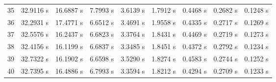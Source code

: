 \begin{landscape}
\begin{longtable}{cllllllll}
    35 &32.9116 s& 16.6887 s& 7.7993 s& 3.6139 s& 1.7912 s& 0.4468 s& 0.2682 s& 0.1248 s\\
    36 &32.2931 s& 17.4771 s& 6.6512 s& 3.4691 s& 1.9558 s& 0.4335 s& 0.2717 s& 0.1269 s\\
    37 &32.5576 s& 16.2437 s& 6.6823 s& 3.3764 s & 1.8431 s& 0.4469 s& 0.2719 s& 0.1273 s\\
    38 &32.4156 s& 16.1199 s & 6.6837 s& 3.3485 s& 1.8451 s& 0.4372 s& 0.2792 s& 0.1234 s\\
    39 &32.7322 s& 16.1902 s& 6.6598 s & 3.5290 s& 1.8274 s& 0.4583 s& 0.2744 s & 0.1252 s\\
    40 &32.7395 s& 16.4886 s& 6.7993 s& 3.3594 s& 1.8212 s& 0.4294 s& 0.2709 s& 0.1233 s
    \label{table:instrumented_amount_benchmark}
  \end{longtable}
\end{landscape}
